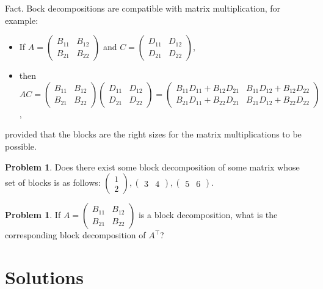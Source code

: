 \documentclass[10pt]{amsart}
\theoremstyle{mythm}
\theoremstyle{definition}
\newtheorem{prob}[thm]{Problem}
\theoremstyle{myrmk}
\begin{document}
	Fact. Bock decompositions are compatible with matrix multiplication, for example: 
	\begin{itemize}
		\item[] If $A = \begin{pmatrix}
		B_{11} & B_{12} \\ B_{21} & B_{22} 
		\end{pmatrix}$ and $C = \begin{pmatrix}
		D_{11} & D_{12} \\ D_{21} & D_{22}
		\end{pmatrix}$, 
		\item[] then $AC = \begin{pmatrix}
		B_{11} & B_{12} \\ B_{21} & B_{22} 
		\end{pmatrix}\begin{pmatrix}
		D_{11} & D_{12} \\ D_{21} & D_{22}
		\end{pmatrix} = \begin{pmatrix}
		B_{11}D_{11} + B_{12}D_{21} & B_{11}D_{12} + B_{12}D_{22} \\ B_{21}D_{11}+B_{22}D_{21} & B_{21}D_{12} + B_{22}D_{22}
		\end{pmatrix}$, 
	\end{itemize}
	provided that the blocks are the right sizes for the matrix multiplications to be possible. 
	\begin{prob}
		Does there exist some block decomposition of some matrix whose set of blocks is as follows: $\begin{pmatrix}
		1 \\2
		\end{pmatrix}, \begin{pmatrix}
		3 & 4
		\end{pmatrix}, \begin{pmatrix}
		5 & 6
		\end{pmatrix}$. 
	\end{prob}
	\begin{prob}
		If $A = \begin{pmatrix}
		B_{11} & B_{12} \\ B_{21} & B_{22} 
		\end{pmatrix}$ is a block decomposition, what is the corresponding block decomposition of $A^\top$? 
	\end{prob}
	
	\newpage
	
	\section{Solutions}
	
\end{document}
